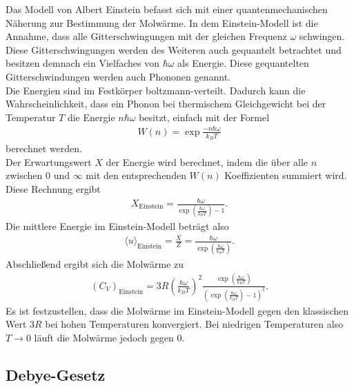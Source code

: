 Das Modell von Albert Einstein befasst sich mit einer quantenmechanischen Näherung zur Bestimmung der Molwärme. In dem Einstein-Modell ist die Annahme, 
dass alle Gitterschwingungen mit der gleichen Frequenz $\omega$ schwingen. Diese Gitterschwingungen werden des Weiteren auch gequantelt betrachtet und besitzen demnach ein 
Vielfaches von $\hbar \omega$ als Energie. Diese gequantelten Gitterschwindungen werden auch Phononen genannt. \\

Die Energien sind im Festkörper boltzmann-verteilt. Dadurch kann die Wahrscheinlichkeit, dass ein Phonon bei thermischem Gleichgewicht bei der Temperatur $T$ die Energie $n \hbar \omega$ besitzt, 
einfach mit der Formel
\begin{align}
    \label{eqn:wn}
    W(n) = \exp{\frac{-n \hbar \omega}{k_B T}}
\end{align}
berechnet werden. \\
Der Erwartungswert $X$ der Energie wird berechnet, indem die über alle $n$ zwischen $0$ und $\infty$ mit den entsprechenden $W(n)$ Koeffizienten summiert wird. 
Diese Rechnung ergibt
\begin{align}
    X_{\text{Einstein}} = \frac{\hbar \omega}{\exp \left( \frac{\hbar \omega}{k_B T}\right) -1} .
\end{align} 
Die mittlere Energie im Einstein-Modell beträgt also 
\begin{align}
    \langle u \rangle_{\text{Einstein}} = \frac{X}{Z} = \frac{\hbar \omega }{\exp \left( \frac{\hbar \omega}{k_B T}\right)}.
\end{align}
Abschließend ergibt sich die Molwärme zu 
\begin{align}
    \label{eqn:moleinstein}
    (C_V)_{\text{Einstein}} = 3 R \left( \frac{\hbar \omega}{k_B T}\right)^2 \frac{\exp \left(\frac{\hbar \omega}{k_B T}\right)}{\left(\exp \left(\frac{\hbar \omega}{k_B T}\right) -1 \right)^2}.
\end{align}
Es ist festzustellen, dass die Molwärme im Einstein-Modell gegen den klassischen Wert $3 R$ bei hohen Temperaturen konvergiert. Bei niedrigen Temperaturen also $T \rightarrow 0$ läuft die Molwärme jedoch gegen $0$.
\subsection{Debye-Gesetz}
\label{sec:debye}


